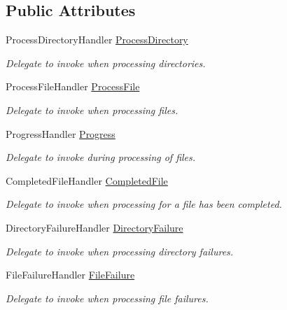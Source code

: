 \subsection*{Public Attributes}
\begin{DoxyCompactItemize}
\item 
Process\+Directory\+Handler \hyperlink{class_i_c_sharp_code_1_1_sharp_zip_lib_1_1_zip_1_1_fast_zip_events_a159a89c479511187e4c989ae149796af}{Process\+Directory}
\begin{DoxyCompactList}\small\item\em Delegate to invoke when processing directories. \end{DoxyCompactList}\item 
Process\+File\+Handler \hyperlink{class_i_c_sharp_code_1_1_sharp_zip_lib_1_1_zip_1_1_fast_zip_events_a3dd9d1b4b6453229cc18b2899ab43788}{Process\+File}
\begin{DoxyCompactList}\small\item\em Delegate to invoke when processing files. \end{DoxyCompactList}\item 
Progress\+Handler \hyperlink{class_i_c_sharp_code_1_1_sharp_zip_lib_1_1_zip_1_1_fast_zip_events_ad53701f02850d1e5939d1b7638bb5e71}{Progress}
\begin{DoxyCompactList}\small\item\em Delegate to invoke during processing of files. \end{DoxyCompactList}\item 
Completed\+File\+Handler \hyperlink{class_i_c_sharp_code_1_1_sharp_zip_lib_1_1_zip_1_1_fast_zip_events_acd15d699c15334063f1500ff5f0633cd}{Completed\+File}
\begin{DoxyCompactList}\small\item\em Delegate to invoke when processing for a file has been completed. \end{DoxyCompactList}\item 
Directory\+Failure\+Handler \hyperlink{class_i_c_sharp_code_1_1_sharp_zip_lib_1_1_zip_1_1_fast_zip_events_a33d748361c7dcfd4c40518b99a689979}{Directory\+Failure}
\begin{DoxyCompactList}\small\item\em Delegate to invoke when processing directory failures. \end{DoxyCompactList}\item 
File\+Failure\+Handler \hyperlink{class_i_c_sharp_code_1_1_sharp_zip_lib_1_1_zip_1_1_fast_zip_events_ae1451c8ef2694b3606c436a6769b917d}{File\+Failure}
\begin{DoxyCompactList}\small\item\em Delegate to invoke when processing file failures. \end{DoxyCompactList}\end{DoxyCompactItemize}
